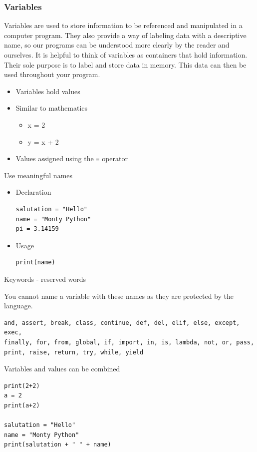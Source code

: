 \documentclass[10pt, a4paper]{beamer} %
\begin{document}
\begin{frame}\frametitle{Variables}

  Variables are used to store information to be referenced and manipulated in a computer program.
  They also provide a way of labeling data with a descriptive name, so our programs can be understood more clearly by the reader and ourselves. 
  It is helpful to think of variables as containers that hold information. 
  Their sole purpose is to label and store data in memory. 
  This data can then be used throughout your program.

  \begin{itemize}
    \item Variables hold values
    \item Similar to mathematics
    \begin{itemize}
      \item x = 2
      \item y = x + 2
    \end{itemize}
    \item Values assigned using the \texttt{=} operator
  \end{itemize}
  \begin{examples}
  Use meaningful names
  \begin{itemize}
    \item Declaration
    \begin{lstlisting}
salutation = "Hello"
name = "Monty Python"
pi = 3.14159
    \end{lstlisting}
    \item Usage
    \begin{lstlisting}
print(name)
    \end{lstlisting}
  \end{itemize}
    
  \end{examples}
\framebreak
\begin{block}{Keywords - reserved words}

You cannot name a variable with these names as they are protected by the language.

\begin{lstlisting}
and, assert, break, class, continue, def, del, elif, else, except, exec, 
finally, for, from, global, if, import, in, is, lambda, not, or, pass, 
print, raise, return, try, while, yield
\end{lstlisting}
  
\end{block}
\framebreak
\begin{block}{Variables and values can be combined}
  \begin{lstlisting}
print(2+2)
a = 2
print(a+2)

salutation = "Hello"
name = "Monty Python"
print(salutation + " " + name)
  \end{lstlisting}
\end{block}
\end{frame}
\end{document}
